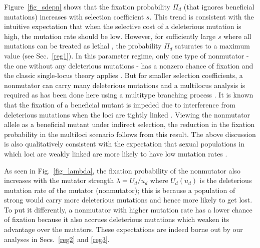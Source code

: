 \documentclass[preprint,12pt,number]{elsarticle}
\begin{document}
Figure~\ref{fig_sdepn} shows that the fixation probability $\Pi_d$ (that ignores beneficial mutations) increases with selection coefficient $s$. This trend is consistent with the intuitive expectation that when the selective cost of a deleterious mutation is high, the mutation rate should be low. However, for sufficiently large $s$ where all mutations can be treated as lethal \citep{Lynch:2011}, the probability $\Pi_d$ saturates to a maximum value (see Sec.~\ref{reg1}).  
In this parameter regime, only one type of nonmutator - the one without any deleterious mutations - has a nonzero chance of fixation and the classic single-locus theory applies \citep{Haldane:1927b,Lynch:2011}. But for smaller selection coefficients, a nonmutator can carry many deleterious mutations and a multilocus analysis is required as has been done here using a multitype branching process \citep{Patwa:2008}. It is known that the fixation of a beneficial mutant is impeded due to interference from deleterious mutations when the loci are tightly linked \citep{Johnson:2002}. Viewing the nonmutator allele as a beneficial mutant under indirect selection, the reduction in the fixation probability in the multiloci scenario follows from this result.  The above discussion is also qualitatively consistent with the expectation that sexual populations in which loci are weakly linked are more likely to have low mutation rates \citep{Johnson:1999a,Tenaillon:2000,Raynes:2011}. 

As seen in Fig.~\ref{fig_lambda}, the fixation probability of the nonmutator also increases  with the mutator strength $\lambda=U_d/u_d$ where $U_d (u_d)$ is the deleterious mutation rate of the mutator (nonmutator); this is because a population of strong  would carry more deleterious mutations and hence more likely to get lost. To put it differently,  
a nonmutator with higher mutation rate has a lower chance of fixation because it also accrues deleterious mutations which weaken its advantage over the mutators. These expectations are indeed borne out by our analyses in Secs.~\ref{reg2} and \ref{reg3}. 
\end{document}

